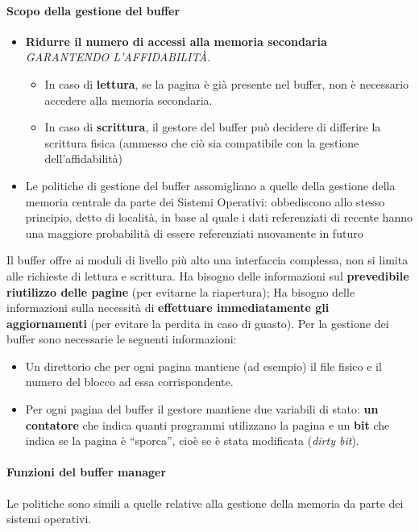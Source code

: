 \documentclass{article}
\newcommand{\sitemize}[1]{%
	\begin{itemize}[label=$\diamond$]
		#1
	\end{itemize}
}
\newcounter{esempio}
\begin{document}
			\paragraph{Scopo della gestione del buffer}\begin{itemize}
				\item \textbf{Ridurre il numero di accessi alla memoria secondaria} \textit{GARANTENDO L'AFFIDABILITÀ.} \sitemize{\item 
				In caso di \textbf{lettura}, se la pagina è già presente nel buffer, non è necessario
				accedere alla memoria secondaria.
				\item In caso di \textbf{scrittura}, il gestore del buffer può decidere di differire la scrittura
				fisica (ammesso che ciò sia compatibile con la gestione dell’affidabilità)}
				
				\item Le politiche di gestione del buffer assomigliano a quelle
				della gestione della memoria centrale da parte dei Sistemi
				Operativi: obbediscono allo stesso principio, detto di località, in base al quale i dati
				referenziati di recente hanno una maggiore probabilità di essere referenziati
				nuovamente in futuro
			\end{itemize}
			
			Il buffer offre ai moduli di livello più alto una interfaccia complessa, non si limita alle richieste di lettura e scrittura. Ha bisogno delle informazioni sul \textbf{prevedibile riutilizzo delle pagine} (per evitarne la riapertura); Ha bisogno delle informazioni sulla necessità di \textbf{effettuare immediatamente gli aggiornamenti} (per evitare la perdita in caso di guasto). Per la gestione dei buffer sono necessarie le seguenti
			informazioni: \begin{itemize}
				\item Un direttorio che per ogni pagina mantiene (ad esempio) il file fisico e il numero del blocco ad essa corrispondente.
				\item Per ogni pagina del buffer il gestore mantiene due variabili di stato: \textbf{un contatore }che indica quanti programmi utilizzano la pagina e un \textbf{bit} che indica se la pagina è “sporca”, cioè se è stata modificata (\textit{dirty bit}).
			\end{itemize}
		
		\paragraph{Funzioni del buffer manager}
		Le politiche sono simili a quelle relative alla gestione della memoria da parte dei sistemi operativi. 
		
\end{document}
